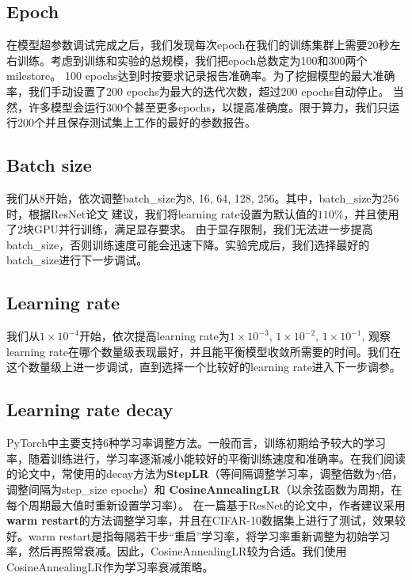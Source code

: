 \documentclass[hyperref, UTF8, 12pt]{article}
\theoremstyle{definition}
\begin{document}
\subsection{Epoch}
在模型超参数调试完成之后，我们发现每次epoch在我们的训练集群上需要20秒左右训练。考虑到训练和实验的总规模，我们把epoch总数定为100和300两个milestore。 100 epochs达到时按要求记录报告准确率。为了挖掘模型的最大准确率，我们手动设置了200 epochs为最大的迭代次数，超过200 epochs自动停止。
当然，许多模型会运行300个甚至更多epochs，以提高准确度。\cite{xie2017aggregated}限于算力，我们只运行200个并且保存测试集上工作的最好的参数报告。

\subsection{Batch size}
我们从8开始，依次调整batch\_size为8, 16, 64, 128, 256。其中，batch\_size为256时，根据ResNet论文\cite{he2015deep} 建议，我们将learning rate设置为默认值的$110\%$，并且使用了2块GPU并行训练，满足显存要求。
由于显存限制，我们无法进一步提高batch\_size，否则训练速度可能会迅速下降。实验完成后，我们选择最好的batch\_size进行下一步调试。

\subsection{Learning rate}
我们从$1 \times 10^{-4}$开始，依次提高learning rate为$1 \times 10^{-3}$, $1 \times 10^{-2}$, $1 \times 10^{-1}$, 观察learning rate在哪个数量级表现最好，并且能平衡模型收敛所需要的时间。我们在这个数量级上进一步调试，直到选择一个比较好的learning rate进入下一步调参。

\subsection{Learning rate decay}
PyTorch中主要支持6种学习率调整方法。一般而言，训练初期给予较大的学习率，随着训练进行，学习率逐渐减小能较好的平衡训练速度和准确率。在我们阅读的论文中，常使用的decay方法为\textbf{StepLR}（等间隔调整学习率，调整倍数为$\gamma$倍，调整间隔为step\_size epochs）和 \textbf{CosineAnnealingLR}（以余弦函数为周期，在每个周期最大值时重新设置学习率）。
在一篇基于ResNet的论文中\cite{loshchilov2017sgdr}，作者建议采用\textbf{warm restart}的方法调整学习率，并且在CIFAR-10数据集上进行了测试，效果较好。warm restart是指每隔若干步“重启”学习率，将学习率重新调整为初始学习率，然后再照常衰减。因此，CosineAnnealingLR较为合适。我们使用CosineAnnealingLR作为学习率衰减策略。
\end{document}
